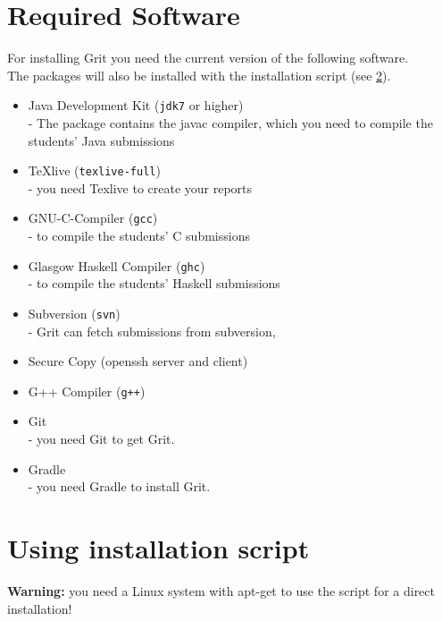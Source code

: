 \documentclass[10pt,a4paper, titlepage, toc=idx]{scrreprt}
\theoremstyle{definition}
\theoremstyle{plain}
\newcommand*{\product}{Grit}
\begin{document}
\section{Required Software}\label{3.1} For installing \product{} you need the current version of the following software.\\
\noindent The packages will also be installed with the installation script (see \ref{3.2}).
\begin{itemize}
\item Java Development Kit (\texttt{jdk7} or higher)\\
		- The package contains the javac compiler, which you need to compile the students' Java submissions
\item \TeX  live (\texttt{texlive-full})\\
		- you need Texlive to create your reports
\item GNU-C-Compiler (\texttt{gcc})\\
		- to compile the students' C submissions
\item Glasgow Haskell Compiler (\texttt{ghc})\\
		- to compile the students' Haskell submissions
\item Subversion (\texttt{svn})\\
		- \product{} can fetch submissions from subversion, 
\item Secure Copy (openssh server and client)
\item G++ Compiler (\texttt{g++})
\item Git\\
		- you need Git to get \product.
\item Gradle\\
		- you need Gradle to install \product.
\end{itemize}

\section{Using installation script}\label{3.2}
\textbf{Warning:} you need a Linux system with apt-get to use the script for a direct installation!\\
\end{document}
